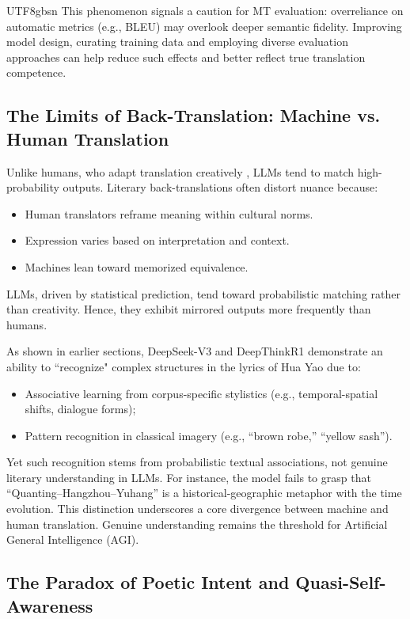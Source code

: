 \documentclass[conference]{IEEEtran}
\begin{document}
\begin{CJK}{UTF8}{gbsn}
This phenomenon signals a caution for MT evaluation: overreliance on automatic metrics (e.g., BLEU) may overlook deeper semantic fidelity. Improving model design, curating training data and employing diverse evaluation approaches can help reduce such effects and better reflect true translation competence.

\subsection{The Limits of Back-Translation: Machine vs. Human Translation}

Unlike humans, who adapt translation creatively \citep{wang2009translation}, LLMs tend to match high-probability outputs. Literary back-translations often distort nuance because:

\begin{itemize}
  \item Human translators reframe meaning within cultural norms.
  \item Expression varies based on interpretation and context.
  \item Machines lean toward memorized equivalence.
\end{itemize}

LLMs, driven by statistical prediction, tend toward probabilistic matching rather than creativity. Hence, they exhibit mirrored outputs more frequently than humans.

As shown in earlier sections, DeepSeek-V3 and DeepThinkR1 demonstrate an ability to ``recognize" complex structures in the lyrics of Hua Yao due to:
\begin{itemize}
\item Associative learning from corpus-specific stylistics (e.g., temporal-spatial shifts, dialogue forms);
\item Pattern recognition in classical imagery (e.g., ``brown robe,'' ``yellow sash'').
\end{itemize}

Yet such recognition stems from probabilistic textual associations, not genuine literary understanding in LLMs. For instance, the model fails to grasp that ``Quanting–Hangzhou–Yuhang'' is a historical-geographic metaphor with the time evolution. This distinction underscores a core divergence between machine and human translation. Genuine understanding remains the threshold for Artificial General Intelligence (AGI).

\subsection{The Paradox of Poetic Intent and Quasi-Self-Awareness}


\end{CJK}
\end{document}
